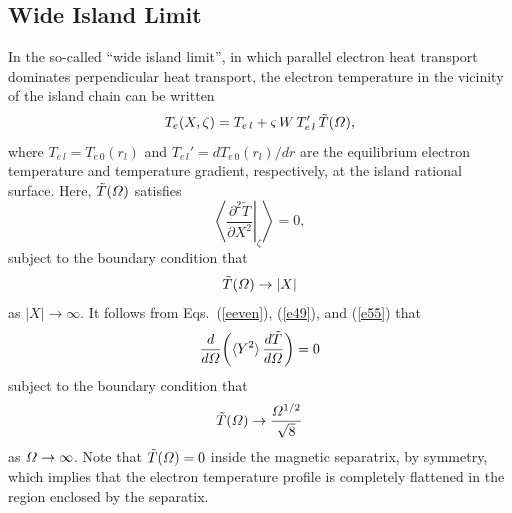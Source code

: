 \documentclass[12pt,prb,aps]{revtex4-1}
\begin{document}
\subsection{Wide Island Limit}
In the so-called ``wide island limit'', in which parallel electron heat transport dominates perpendicular heat transport,\cite{ntm2,island}
the electron temperature in the vicinity of the island chain can be written
\begin{equation}
T_e(X,\zeta) = T_{e\,l} + \varsigma\,W\,T_{e\,l}'\,\tilde{T}({\mit\Omega}),
\end{equation}
where $T_{e\,l}= T_{e\,0}(r_l)$ and $T_{e\,l}' = dT_{e\,0}(r_l)/dr$ are the equilibrium electron temperature and  temperature
gradient, respectively, at the island rational surface. 
Here, 
$\tilde{T}({\mit\Omega})$ satisfies\,\cite{ntm2}
\begin{equation}\label{e30}
\left\langle \left.\frac{\partial ^2\tilde{T}}{\partial X^2}\right|_\zeta \right\rangle =0,
\end{equation}
subject to the boundary condition that
\begin{equation}
\tilde{T}({\mit\Omega})\rightarrow |X|
\end{equation}
as $|X|\rightarrow \infty$. It
follows  from Eqs.~(\ref{eeven}), (\ref{e49}), and (\ref{e55})  that
\begin{equation}\label{e34}
\frac{d}{d{\mit\Omega}}\!\left(\langle Y^2\rangle\,\frac{d\tilde{T}}{d{\mit\Omega}}\right)=0
\end{equation}
subject to the boundary condition that
\begin{equation}
\tilde{T}({\mit\Omega})\rightarrow \frac{{\mit\Omega}^{1/2}}{\sqrt{8}}
\end{equation}
as ${\mit\Omega}\rightarrow\infty$. Note that $\tilde{T}({\mit\Omega})=0$ inside the magnetic separatrix, by symmetry, which implies that the electron
temperature profile is completely flattened in the region enclosed  by the separatix. \cite{ntm2}
\end{document}
